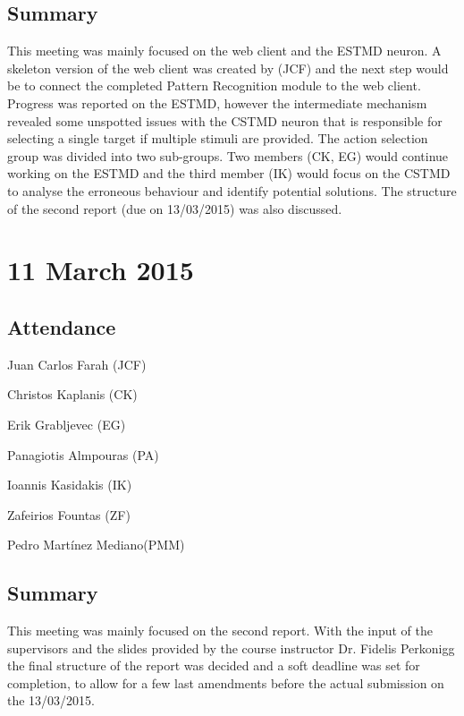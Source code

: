 \documentclass[a4paper,11pt]{article}
\begin{document}
\subsection*{Summary}
This meeting was mainly focused on the web client and the ESTMD neuron. A skeleton version of the web client was created by (JCF) and the next step would be to connect the completed Pattern Recognition module to the web client. Progress was reported on the ESTMD, however the intermediate mechanism revealed some unspotted issues with the CSTMD neuron that is responsible for selecting a single target if multiple stimuli are provided. The action selection group was divided into two sub-groups. Two members (CK, EG) would continue working on the ESTMD and the third member (IK) would focus on the CSTMD to analyse the erroneous behaviour and identify potential solutions. The structure of the second report (due on 13/03/2015) was also discussed.

\maketitle
\section*{11 March 2015}
\subsection*{Attendance}
\begin{compactenum}
\item Juan Carlos Farah (JCF)
\item Christos Kaplanis (CK)
\item Erik Grabljevec (EG)
\item Panagiotis Almpouras (PA)
\item Ioannis Kasidakis (IK)
\item Zafeirios Fountas (ZF)
\item Pedro Martínez Mediano(PMM)
\end{compactenum}

\subsection*{Summary}
This meeting was mainly focused on the second report. With the input of the supervisors and the slides provided by the course instructor Dr. Fidelis Perkonigg the final structure of the report was decided and a soft deadline was set for completion, to allow for a few last amendments before the actual submission on the 13/03/2015.
\end{document}

